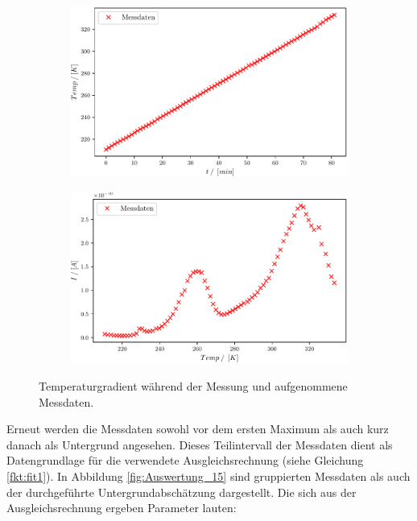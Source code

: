 \begin{figure}[H]
\centering
\begin{subfigure}{.5\textwidth}
	\centering
	\includegraphics[width=1\textwidth]{build/2_Temp_Time.pdf}
	\caption{}
	\label{fig:Auswertung_13}
\end{subfigure}%
\begin{subfigure}{.5\textwidth}
	\centering
	\includegraphics[width=1\textwidth]{build/2_Temp_current.pdf}
	\caption{}
	\label{fig:Auswertung_14}
\end{subfigure}
\caption{Temperaturgradient während der Messung und aufgenommene Messdaten.}
\label{fig:Auswertung_13_14}
\end{figure}

Erneut werden die Messdaten sowohl vor dem ersten Maximum als auch kurz danach als Untergrund angesehen. Dieses Teilintervall der Messdaten dient als Datengrundlage für die verwendete Ausgleichsrechnung (siehe Gleichung \ref{fkt:fit1}). In Abbildung \ref{fig:Auswertung_15} sind gruppierten Messdaten als auch der durchgeführte Untergrundabschätzung dargestellt. Die sich aus der Ausgleichsrechnung ergeben Parameter lauten:

